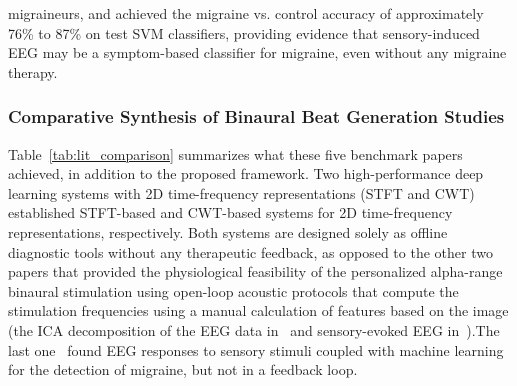 \documentclass[12pt, a4paper]{report}
\begin{document}
migraineurs, and achieved the migraine vs. control accuracy of approximately 76\% to 87\% on test SVM classifiers, providing evidence that sensory-induced EEG may be a symptom-based classifier for migraine, even without any migraine therapy.

\subsubsection{Comparative Synthesis of Binaural Beat Generation Studies}
Table~\ref{tab:lit_comparison} summarizes what these five benchmark papers achieved, in addition to the proposed framework. Two high-performance deep learning systems with 2D time-frequency representations (STFT and CWT)~\cite{orhanbulucu2023hybrid, aslan2023migrainecnn} established STFT-based and CWT-based systems for 2D time-frequency representations, respectively. Both systems are designed solely as offline diagnostic tools without any therapeutic feedback, as opposed to the other two papers that provided the physiological feasibility of the personalized alpha-range binaural stimulation using open-loop acoustic protocols that compute the stimulation frequencies using a manual calculation of features based on the image (the ICA decomposition of the EEG data in~\cite{li2023modulating} and sensory-evoked EEG in~\cite{battu2025longterm}).The last one~\cite{hsiao2024brainstem} found EEG responses to sensory stimuli coupled with machine learning for the detection of migraine, but not in a feedback loop.
\end{document}
